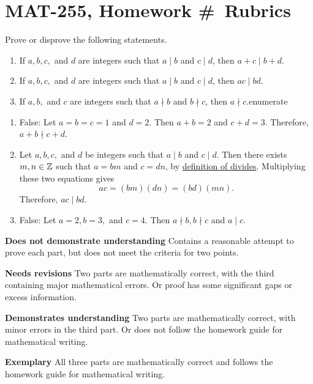 \documentclass[letterpaper, 11 pt]{../ximera}
\begin{document}
\chapter{MAT-255, Homework \#\homework\ Rubrics}

\begin{problem}\label{ch1-ex5}%
    Prove or disprove the following statements.%
            \begin{enumerate}[label=(\alph*)]
            \item If \(a,b,c,\) and \(d\) are integers such that \(a\mid b\) and \(c\mid d\), then \(a+c\mid b+d\).%
            \item If \(a,b,c,\) and \(d\) are integers such that \(a\mid b\) and \(c\mid d\), then \(ac\mid bd\).%
            \item If \(a,b,\) and \(c\) are integers such that \(a\nmid b\) and \(b\nmid c\), then \(a\nmid c\).enumerate%
    \end{enumerate}
%
    
    \begin{solution}
         \begin{enumerate}[label=(\alph*)]
            \item False: Let \(a=b=c=1\) and \(d=2\). Then \(a+b=2\) and \(c+d=3\). Therefore, \(a+b\nmid c+d\).%
            \item Let \(a,b,c,\) and \(d\) be integers such that \(a\mid b\) and \(c\mid d\). Then there exists \(m,n\in\mathbb Z\) such that \(a=bm\) and \(c=dn\), by \hyperref[def-divides]{definition of divides}. Multiplying these two equations gives \[ac=(bm)(dn)=(bd)(mn).\]  Therefore, \(ac\mid bd\).%
            \item False: Let \(a=2, b=3,\) and \(c=4\). Then \(a\nmid b, b\nmid c\) and \(a\mid c\).
        \end{enumerate}
    \end{solution}


    \begin{writeRubric}
        \item \textbf{Does not demonstrate understanding}
            Contains a reasonable attempt to prove each part, but does not meet the criteria for two points.
        \item \textbf{Needs revisions}
            Two parts are mathematically correct, with the third containing major mathematical errors. Or proof has some significant gaps or excess information.
        \item \textbf{Demonstrates understanding}
            Two parts are mathematically correct, with minor errors in the third part. Or does not follow the homework guide for mathematical writing.
        \item \textbf{Exemplary}
            All three parts are mathematically correct and follows the homework guide for mathematical writing.
    \end{writeRubric}
%
\end{problem}
\end{document}
